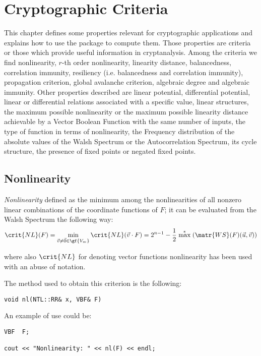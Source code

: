 \chapter{Cryptographic Criteria}

This chapter defines some properties relevant for cryptographic applications and explains how to use the package to compute them. Those properties are criteria or those which provide useful information in cryptanalysis. Among the criteria we find nonlinearity, $r$-th order nonlinearity, linearity distance, balancedness, correlation immunity, resiliency (i.e. balancedness and correlation immunity), propagation criterion, global avalanche criterion, algebraic degree and algebraic immunity. Other properties described are linear potential, differential potential, linear or differential relations associated with a specific value, linear structures, the maximum possible nonlinearity or the maximum possible linearity distance achievable by a Vector Boolean Function with the same number of inputs, the type of function in terms of nonlinearity, the Frequency distribution of the absolute values of the Walsh Spectrum or the Autocorrelation Spectrum, its cycle structure, the presence of fixed points or negated fixed points.

\section{Nonlinearity}

\textsl{Nonlinearity} defined as the minimum among the nonlinearities of
  all nonzero linear combinations of the coordinate functions of $F$; it can
  be evaluated from the Walsh Spectrum the following way:  
\begin{equation}\label{NonlinearityVectorBooleanFunction}
\crit{NL}(F) = \min_{\vec{v} \neq \vec{0} \in \gf{V_m}} \crit{NL}(\vec{v} \cdot
F) = 2^{n-1}-\frac{1}{2} \stackrel{*}{\max}(\matr{WS}(F)(\vec{u},\vec{v}))
\end{equation} 

where also $\crit{NL}$ for denoting vector functions nonlinearity has been
used with an abuse of notation. 

The method used to obtain this criterion is the following:

\begin{verbatim}
void nl(NTL::RR& x, VBF& F)
\end{verbatim}

An example of use could be:

\begin{verbatim}
VBF  F;

cout << "Nonlinearity: " << nl(F) << endl;
\end{verbatim}

